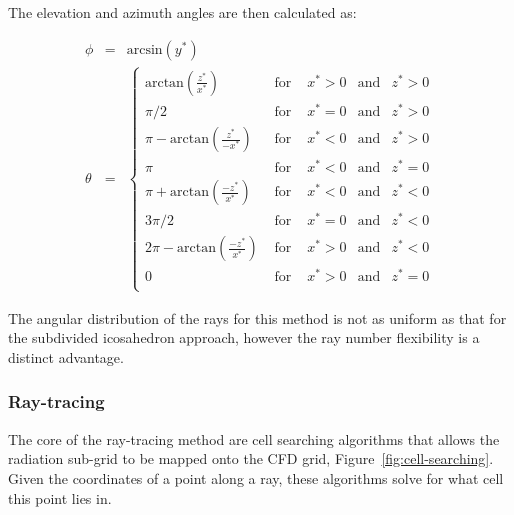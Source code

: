 \noindent The elevation and azimuth angles are then calculated as:

\begin{eqnarray}
 \phi &=& \text{arcsin} \left ( y^\ast \right ) \\
 \theta &=& \left \lbrace \begin{array}{ccccc} \text{arctan} \left ( \frac{z^\ast}{x^\ast} \right ) & \text{ for } & x^\ast > 0 & \text{and} & z^\ast > 0 \\
 										  \pi / 2                                                                 & \text{ for } & x^\ast = 0 & \text{and} & z^\ast > 0 \\
  										  \pi - \text{arctan} \left ( \frac{z^\ast}{-x^\ast} \right ) & \text{ for } & x^\ast < 0 & \text{and} & z^\ast > 0 \\ 
										  \pi                                                                      & \text{ for } & x^\ast < 0 & \text{and} & z^\ast = 0 \\
										  \pi + \text{arctan} \left ( \frac{-z^\ast}{x^\ast} \right ) & \text{ for } & x^\ast < 0 & \text{and} & z^\ast < 0 \\ 
										  3 \pi / 2                                                              & \text{ for } & x^\ast = 0 & \text{and} & z^\ast < 0 \\ 
										  2\pi - \text{arctan} \left ( \frac{-z^\ast}{x^\ast} \right ) & \text{ for } & x^\ast > 0 & \text{and} & z^\ast < 0 \\
										  0                                                                        & \text{ for } & x^\ast > 0 & \text{and} & z^\ast = 0 \\ \end{array} \right .
\end{eqnarray}

\noindent The angular distribution of the rays for this method is not as uniform as that for the subdivided icosahedron approach, however the ray number flexibility is a distinct advantage.

\subsubsection{Ray-tracing}
\label{sec:ray_tracing}

The core of the ray-tracing method are cell searching algorithms that allows the radiation sub-grid to be mapped onto the CFD grid, Figure~\ref{fig:cell-searching}.
Given the coordinates of a point along a ray, these algorithms solve for what cell this point lies in.

